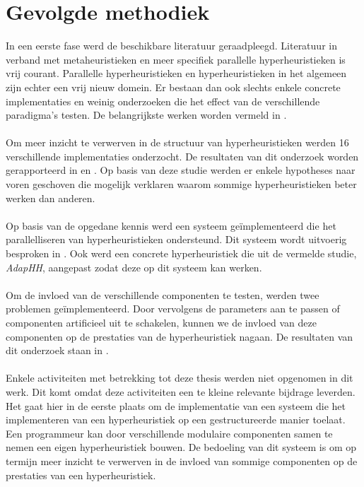 \section{Gevolgde methodiek}

In een eerste fase werd de beschikbare literatuur geraadpleegd. Literatuur in verband met metaheuristieken en meer specifiek parallelle hyperheuristieken is vrij courant. Parallelle hyperheuristieken en hyperheuristieken in het algemeen zijn echter een vrij nieuw domein. Er bestaan dan ook slechts enkele concrete implementaties en weinig onderzoeken die het effect van de verschillende paradigma's testen. De belangrijkste werken worden vermeld in .

\paragraph{}
Om meer inzicht te verwerven in de structuur van hyperheuristieken werden 16 verschillende implementaties onderzocht. De resultaten van dit onderzoek worden gerapporteerd in  en . Op basis van deze studie werden er enkele hypotheses naar voren geschoven die mogelijk verklaren waarom sommige hyperheuristieken beter werken dan anderen.

\paragraph{}
Op basis van de opgedane kennis werd een systeem ge\"implementeerd die het parallelliseren van hyperheuristieken ondersteund. Dit systeem wordt uitvoerig besproken in . Ook werd een concrete hyperheuristiek die uit de vermelde studie, \emph{AdapHH}, aangepast zodat deze op dit systeem kan werken.

\paragraph{}
Om de invloed van de verschillende componenten te testen, werden twee problemen ge\"implementeerd. Door vervolgens de parameters aan te passen of componenten artificieel uit te schakelen, kunnen we de invloed van deze componenten op de prestaties van de hyperheuristiek nagaan. De resultaten van dit onderzoek staan in .

\paragraph{}
Enkele activiteiten met betrekking tot deze thesis werden niet opgenomen in dit werk. Dit komt omdat deze activiteiten een te kleine relevante bijdrage leverden. Het gaat hier in de eerste plaats om de implementatie van een systeem die het implementeren van een hyperheuristiek op een gestructureerde manier toelaat. Een programmeur kan door verschillende modulaire componenten samen te nemen een eigen hyperheuristiek bouwen. De bedoeling van dit systeem is om op termijn meer inzicht te verwerven in de invloed van sommige componenten op de prestaties van een hyperheuristiek.

